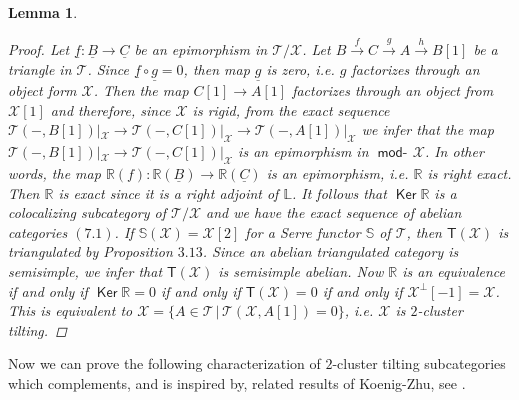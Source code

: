 \documentclass[oneside, a4paper,reqno]{amsart}
\numberwithin{equation}{section}
\newtheorem{lem}[thm]{Lemma}
\theoremstyle{definition}
\begin{document}
\begin{lem}
\begin{proof} Let ${\underline f} \colon {\underline B} {\longrightarrow} {\underline C}$ be an epimorphism in ${\mathcal T}/{\mathcal X}$. Let $B \stackrel{f}{\longrightarrow} C \stackrel{g}{\longrightarrow} A \stackrel{h}{\longrightarrow} B[1]$ be a triangle in ${\mathcal T}$. Since  ${\underline f} \circ {\underline g} = 0$, then map ${\underline g}$ is zero, i.e. $g$ factorizes through an object form ${\mathcal X}$. Then the map $C[1] {\longrightarrow} A[1]$ factorizes through  an object from ${\mathcal X}[1]$ and therefore, since ${\mathcal X}$ is rigid, from the exact sequence  ${\mathcal T}(-,B[1])|_{\mathcal X} {\longrightarrow} {\mathcal T}(-,C[1])|_{\mathcal X} {\longrightarrow} {\mathcal T}(-,A[1])|_{\mathcal X}$ we infer that the map ${\mathcal T}(-,B[1])|_{\mathcal X} {\longrightarrow} {\mathcal T}(-,C[1])|_{\mathcal X}$ is an epimorphism in $\operatorname*{\mathsf{mod}-\!}{\mathcal X}$. In other words, the map $\mathbb R(f) \colon \mathbb R({\underline B}) {\longrightarrow} \mathbb R({\underline C})$ is an epimorphism, i.e. $\mathbb R$ is right exact. Then $\mathbb R$ is exact since it is a right adjoint of $\mathbb L$. It follows that $\operatorname*{\mathsf{Ker}}\mathbb R$ is a colocalizing subcategory of ${\mathcal T}/{\mathcal X}$ and we have  the exact sequence of abelian categories $(7.1)$. If $\mathbb S({\mathcal X}) = {\mathcal X}[2]$ for a Serre functor $\mathbb S$ of ${\mathcal T}$,  then  $\mathsf{T}({\mathcal X})$ is triangulated by Proposition $3.13$. Since an abelian triangulated category is semisimple, we infer that $\mathsf{T}({\mathcal X})$ is semisimple abelian.  Now $\mathbb R$ is an equivalence if and only if $\operatorname*{\mathsf{Ker}}\mathbb R = 0$ if and only if  $\mathsf{T}({\mathcal X}) = 0$ if and only if ${\mathcal X}^{\bot}[-1] = {\mathcal X}$. This is equivalent to  ${\mathcal X} = \big\{A \in {\mathcal T} \, | \, {\mathcal T}({\mathcal X},A[1]) = 0 \big\}$, i.e. ${\mathcal X}$ is $2$-cluster tilting. 
\end{proof}
\end{lem} 

Now we can prove the following characterization of $2$-cluster tilting subcategories which complements, and is inspired by, related results of Koenig-Zhu, see \cite[Theorems 5.1, 5.2]{KZ}. 
\end{document}
